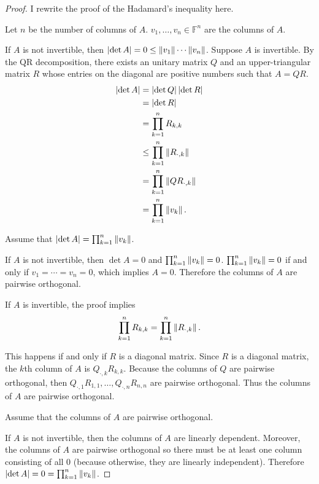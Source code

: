 \begin{proof}
    I rewrite the proof of the Hadamard's inequality here.

    Let $n$ be the number of columns of $A$. $v_{1}, \ldots, v_{n} \in \mathbb{F}^{n}$ are the columns of $A$.

    If $A$ is not invertible, then $\left\vert{\det A}\right\vert = 0 \leq \left\Vert{v_{1}}\right\Vert\cdots \left\Vert{v_{n}}\right\Vert$. Suppose $A$ is invertible. By the QR decomposition, there exists an unitary matrix $Q$ and an upper-triangular matrix $R$ whose entries on the diagonal are positive numbers such that $A = QR$.
    \begin{align*}
        \left\vert{\det A}\right\vert & = \left\vert{\det Q}\right\vert\left\vert{\det R}\right\vert             \\
                     & = \left\vert{\det R}\right\vert                         \\
                     & = \prod^{n}_{k=1}R_{k,k}               \\
                     & \leq \prod^{n}_{k=1}\left\Vert{R_{\cdot,k}}\right\Vert \\
                     & = \prod^{n}_{k=1}\left\Vert{QR_{\cdot,k}}\right\Vert   \\
                     & = \prod^{n}_{k=1}\left\Vert{v_{k}}\right\Vert.
    \end{align*}

    Assume that $\left\vert{\det A}\right\vert = \prod^{n}_{k=1}\left\Vert{v_{k}}\right\Vert$.

    If $A$ is not invertible, then $\det A = 0$ and $\prod^{n}_{k=1}\left\Vert{v_{k}}\right\Vert = 0$. $\prod^{n}_{k=1}\left\Vert{v_{k}}\right\Vert = 0$ if and only if $v_{1} = \cdots = v_{n} = 0$, which implies $A = 0$. Therefore the columns of $A$ are pairwise orthogonal.

    If $A$ is invertible, the proof implies
    \[
        \prod^{n}_{k=1}R_{k,k} = \prod^{n}_{k=1}\left\Vert{R_{\cdot,k}}\right\Vert.
    \]

    This happens if and only if $R$ is a diagonal matrix. Since $R$ is a diagonal matrix, the $k$th column of $A$ is $Q_{\cdot,k}R_{k,k}$. Because the columns of $Q$ are pairwise orthogonal, then $Q_{\cdot,1}R_{1,1}, \ldots, Q_{\cdot,n}R_{n,n}$ are pairwise orthogonal. Thus the columns of $A$ are pairwise orthogonal.

    \bigskip
    Assume that the columns of $A$ are pairwise orthogonal.

    If $A$ is not invertible, then the columns of $A$ are linearly dependent. Moreover, the columns of $A$ are pairwise orthogonal so there must be at least one column consisting of all $0$ (because otherwise, they are linearly independent). Therefore $\left\vert{\det A}\right\vert = 0 = \prod^{n}_{k=1}\left\Vert{v_{k}}\right\Vert$.


\end{proof}
